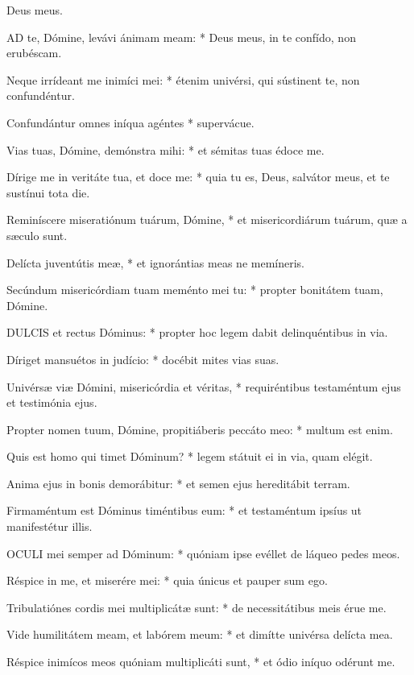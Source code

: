  Deus meus.


\lettrine[lines=2]{A}{D} te, Dómine, levávi ánimam meam: * Deus meus, in te confído, non erubéscam.

Neque irrídeant me inimíci mei: * étenim univérsi, qui sústinent te, non confundéntur.

Confundántur omnes iníqua agéntes * supervácue.

Vias tuas, Dómine, demónstra mihi: * et sémitas tuas édoce me.

Dírige me in veritáte tua, et doce me: * quia tu es, Deus, salvátor meus, et te sustínui tota die.

Reminíscere miseratiónum tuárum, Dómine, * et misericordiárum tuárum, quæ a sæculo sunt.

Delícta juventútis meæ, * et ignorántias meas ne memíneris.

Secúndum misericórdiam tuam meménto mei tu: * propter bonitátem tuam, Dómine.


\lettrine[lines=2]{D}{ULCIS} et rectus Dóminus: * propter hoc legem dabit delinquéntibus in via.

Díriget mansuétos in judício: * docébit mites vias suas.

Univérsæ viæ Dómini, misericórdia et véritas, * requiréntibus testaméntum ejus et testimónia ejus.

Propter nomen tuum, Dómine, propitiáberis peccáto meo: * multum est enim.

Quis est homo qui timet Dóminum? * legem státuit ei in via, quam elégit.

Anima ejus in bonis demorábitur: * et semen ejus hereditábit terram.

Firmaméntum est Dóminus timéntibus eum: * et testaméntum ipsíus ut manifestétur illis.


\lettrine[lines=2]{O}{CULI} mei semper ad Dóminum: * quóniam ipse evéllet de láqueo pedes meos.

Réspice in me, et miserére mei: * quia únicus et pauper sum ego.

Tribulatiónes cordis mei multiplicátæ sunt: * de necessitátibus meis érue me.

Vide humilitátem meam, et labórem meum: * et dimítte univérsa delícta mea.

Réspice inimícos meos quóniam multiplicáti sunt, * et ódio iníquo odérunt me.


